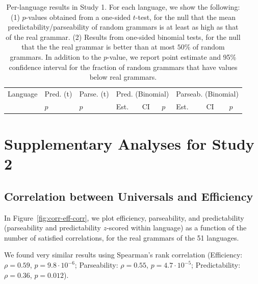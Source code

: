\documentclass[10pt,twoside,lineno]{article}
\begin{document}
\begin{table}
\centering
\small{
\begin{tabular}{l||ll|lll|lll}
Language & Pred. (t) & Parse. (t) & \multicolumn{3}{|c|}{Pred. (Binomial)} & \multicolumn{3}{|c|}{Parseab. (Binomial)} \\ 
&  $p$ & $p$ &  Est. &CI & $p$ & Est. & CI & $p$  \\ \hline \hline

\end{tabular}
}
\caption{Per-language results in Study 1. For each language, we show the following: (1) $p$-values obtained from a one-sided $t$-test, for the null that the mean predictability/parseability of random grammars is at least as high as that of the real grammar. (2) Results from one-sided binomial tests, for the null that the the real grammar is better than at most $50 \%$ of random grammars. In addition to the $p$-value, we report point estimate and 95\% confidence interval for the fraction of random grammars that have values below real grammars.}\label{fig:pareto-per-lang-stats}
\end{table}



\section{Supplementary Analyses for Study 2}
\subsection{Correlation between Universals and Efficiency}

In Figure~\ref{fig:corr-eff-corr}, we plot efficiency, parseability, and predictability (parseability and predictability $z$-scored within language) as a function of the number of satisfied correlations, for the real grammars of the 51 languages.

We found very similar results using Spearman's rank correlation (Efficiency: $\rho=0.59$, $p = 9.8 \cdot 10^{-6}$; Parseability: $\rho=0.55$, $p=4.7 \cdot 10^{-5}$; Predictability: $\rho=0.36$, $p=0.012$).
\end{document}
